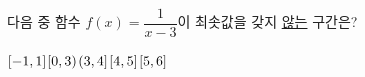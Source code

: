 다음 중 함수 $f(x)=\dfrac{1}{x-3}$이 최솟값을 갖지 \underline{않는} 구간은?
\begin{choices32}{$[-1{,}\mkern3mu\mathopen{}1]$}{$[0{,}\mkern3mu\mathopen{}3)$}{$(3{,}\mkern3mu\mathopen{}4]$}{$[4{,}\mkern3mu\mathopen{}5]$}{$[5{,}\mkern3mu\mathopen{}6]$}\end{choices32}
